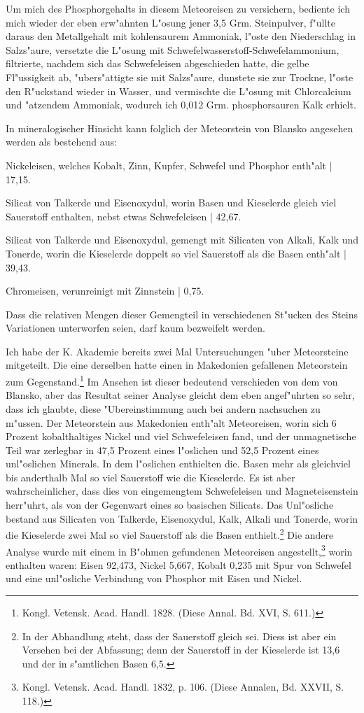 \documentclass[a4paper, 11pt, oneside]{article}
\begin{document}
Um mich des Phosphorgehalts in diesem Meteoreisen zu versichern, bediente ich mich wieder der eben erw"ahnten L"osung jener 3,5 Grm. Steinpulver, f"ullte daraus den Metallgehalt mit kohlensaurem Ammoniak‚ l"oste den Niederschlag in Salzs"aure, versetzte die L"osung mit Schwefelwasserstoff-Schwefelammonium, filtrierte, nachdem sich das Schwefeleisen abgeschieden hatte, die gelbe Fl"ussigkeit ab, "ubers"attigte sie mit Salzs"aure, dunstete sie zur Trockne, l"oste den R"uckstand wieder in Wasser, und vermischte die L"osung mit Chlorcalcium und "atzendem Ammoniak, wodurch ich 0,012 Grm. phosphorsauren Kalk erhielt.

In mineralogischer Hinsicht kann folglich der Meteorstein von Blansko angesehen werden als bestehend aus:

Nickeleisen, welches Kobalt, Zinn, Kupfer, Schwefel und Phosphor enth"alt | 17,15.

Silicat von Talkerde und Eisenoxydul, worin Basen und Kieselerde gleich viel Sauerstoff enthalten, nebst etwas Schwefeleisen | 42,67.

Silicat von Talkerde und Eisenoxydul, gemengt mit Silicaten von Alkali, Kalk und Tonerde, worin die Kieselerde doppelt so viel Sauerstoff als die Basen enth"alt | 39,43.

Chromeisen, verunreinigt mit Zinnstein | 0,75.

Dass die relativen Mengen dieser Gemengteil in verschiedenen St"ucken des Steins Variationen unterworfen seien, darf kaum bezweifelt werden.

Ich habe der K. Akademie bereits zwei Mal Untersuchungen "uber Meteorsteine mitgeteilt. Die eine derselben hatte einen in Makedonien gefallenen Meteorstein zum Gegenstand.\footnote{Kongl. Vetensk. Acad. Handl. 1828. (Diese Annal. Bd. XVI, S. 611.)} Im Ansehen ist dieser bedeutend verschieden von dem von Blansko, aber das Resultat seiner Analyse gleicht dem eben angef"uhrten so sehr, dass ich glaubte, diese "Ubereinstimmung auch bei andern nachsuchen zu m"ussen. Der Meteorstein aus Makedonien enth"alt Meteoreisen, worin sich 6 Prozent kobalthaltiges Nickel und viel Schwefeleisen fand, und der unmagnetische Teil war zerlegbar in 47,5 Prozent eines l"oslichen und 52,5 Prozent eines unl"oslichen Minerals. In dem l"oslichen enthielten die. Basen mehr als gleichviel bis anderthalb Mal so viel Sauerstoff wie die Kieselerde. Es ist aber wahrscheinlicher, dass dies von eingemengtem Schwefeleisen und Magneteisenstein herr"uhrt, als von der Gegenwart eines so basischen Silicats. Das Unl"osliche bestand aus Silicaten von Talkerde, Eisenoxydul, Kalk, Alkali und Tonerde, worin die Kieselerde zwei Mal so viel Sauerstoff als die Basen enthielt.\footnote{In der Abhandlung steht, dass der Sauerstoff gleich sei. Diess ist aber ein Versehen bei der Abfassung; denn der Sauerstoff in der Kieselerde ist 13,6 und der in s"amtlichen Basen 6,5.} Die andere Analyse wurde mit einem in B"ohmen gefundenen Meteoreisen angestellt,\footnote{Kongl. Vetensk. Acad. Handl. 1832, p. 106. (Diese Annalen, Bd. XXVII, S. 118.)} worin enthalten waren: Eisen 92,473, Nickel 5,667, Kobalt 0,235 mit Spur von Schwefel und eine unl"osliche Verbindung von Phosphor mit Eisen und Nickel.
\end{document}
